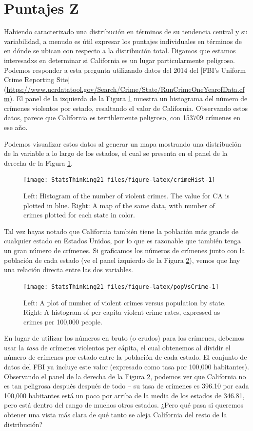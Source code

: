 \documentclass[
  12pt,
]{book}
\theoremstyle{definition}
\theoremstyle{definition}
\theoremstyle{definition}
\theoremstyle{remark}
\begin{document}
\hypertarget{puntajes-z}{%
\section{Puntajes Z}\label{puntajes-z}}

Habiendo caracterizado una distribución en términos de su tendencia central y su variabilidad, a menudo es útil expresar los puntajes individuales en términos de en dónde se ubican con respecto a la distribución total. Digamos que estamos interesadxs en determinar si California es un lugar particularmente peligroso. Podemos responder a esta pregunta utilizando datos del 2014 del {[}FBI's Uniform Crime Reporting Site{]} (\url{https://www.ucrdatatool.gov/Search/Crime/State/RunCrimeOneYearofData.cfm}).
El panel de la izquierda de la Figura \ref{fig:crimeHist} muestra un histograma del número de crímenes violentos por estado, resaltando el valor de California. Observando estos datos, parece que California es terriblemente peligroso, con 153709 crímenes en ese año.

Podemos visualizar estos datos al generar un mapa mostrando una distribución de la variable a lo largo de los estados, el cual se presenta en el panel de la derecha de la Figura \ref{fig:crimeHist}.

\begin{figure}
\texttt{[image: StatsThinking21\_files/figure-latex/crimeHist-1]} \caption{Left: Histogram of the number of violent crimes.  The value for CA is plotted in blue. Right: A map of the same data, with number of crimes plotted for each state in color.}\label{fig:crimeHist}
\end{figure}

Tal vez hayas notado que California también tiene la población más grande de cualquier estado en Estados Unidos, por lo que es razonable que también tenga un gran número de crímenes. Si graficamos los números de crímenes junto con la población de cada estado (ve el panel izquierdo de la Figura \ref{fig:popVsCrime}), vemos que hay una relación directa entre las dos variables.

\begin{figure}
\texttt{[image: StatsThinking21\_files/figure-latex/popVsCrime-1]} \caption{Left: A plot of number of violent crimes versus population by state. Right: A histogram of per capita violent crime rates, expressed as crimes per 100,000 people.}\label{fig:popVsCrime}
\end{figure}

En lugar de utilizar los números en bruto (o crudos) para los crímenes, debemos usar la \emph{tasa} de crímenes violentos per cápita, el cual obtenemos al dividir el número de crímenes por estado entre la población de cada estado. El conjunto de datos del FBI ya incluye este valor (expresado como tasa por 100,000 habitantes). Observando el panel de la derecha de la Figura \ref{fig:popVsCrime}, podemos ver que California no es tan peligrosa después después de todo -- su tasa de crímenes es 396.10 por cada 100,000 habitantes está un poco por arriba de la media de los estados de 346.81, pero está dentro del rango de muchos otros estados. ¿Pero qué pasa si queremos obtener una vista más clara de qué tanto se aleja California del resto de la distribución?
\end{document}
